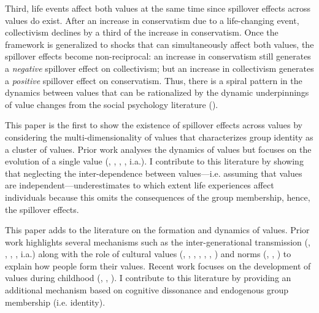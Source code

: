 Third, life events affect both values at the same time since spillover effects across values do exist. After an increase in conservatism due to a life-changing event, collectivism declines by a third of the increase in conservatism. Once the framework is generalized to shocks that can simultaneously affect both values, the spillover effects become non-reciprocal: an increase in conservatism still generates a \textit{negative} spillover effect on collectivism; but an increase in collectivism generates a \textit{positive} spillover effect on conservatism. Thus, there is a spiral pattern in the dynamics between values that can be rationalized by the dynamic underpinnings of value changes from the social psychology literature (\citealt{Schwartz2012Overview}).

This paper is the first to show the existence of spillover effects across values by considering the multi-dimensionality of values that characterizes group identity as a cluster of values. Prior work analyses the dynamics of values but focuses on the evolution of a single value (\citealt{Piketty1995Social}, \citealt{Mayda2006Against}, \citealt{Fernandez2007Women}, \citealt{Alesina2018Intergenerational}, i.a.). I contribute to this literature by showing that neglecting the inter-dependence between values---i.e. assuming that values are independent---underestimates to which extent life experiences affect individuals because this omits the consequences of the group membership, hence, the spillover effects.

This paper adds to the literature on the formation and dynamics of values. Prior work highlights several mechanisms such as the inter-generational transmission (\citealt{Bisin2001Economics, Bisin2011Economics}, \citealt{Montgomery2010Intergenerational}, \citealt{Hiller2016Cultural}, \citealt{Alan2017Transmission}, i.a.) along with the role of cultural values (\citealt{Ichino2000Work}, \citealt{Fernandez2004Mothers}, \citealt{Guiso2006Culture}, \citealt{Fernandez2007Women}, \citealt{Giuliano2007Living}, \citealt{Chen2013Effect}, \citealt{Alesina2014Family}) and norms (\citealt{Fehr2002Psychological}, \citealt{Bardi2003Values}, \citealt{Tabellini2008Scope}) to explain how people form their values. Recent work focuses on the development of values during childhood (\citealt{Fehr2013Development}, \citealt{Doepke2017Parenting}, \citealt{Basic2020Development}).
I contribute to this literature by providing an additional mechanism based on cognitive dissonance and endogenous group membership (i.e. identity).

